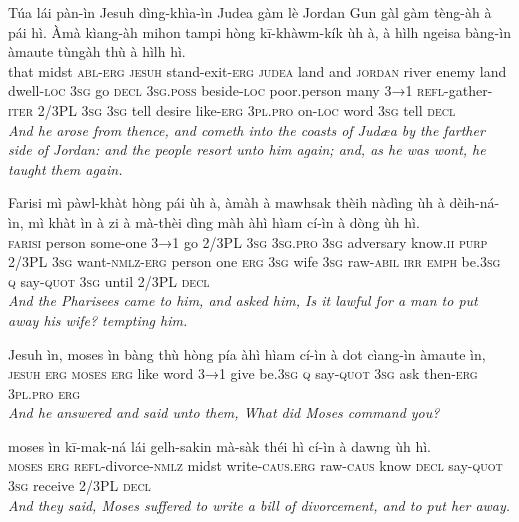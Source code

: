 \documentclass[11pt,a4paper]{article}
\begin{document}
\begin{exe}
\gll Túa lái pàn-ìn Jesuh dìng-khìa-ìn Judea gàm lè Jordan Gun gàl gàm tèng-àh à pái hì. Àmà kìang-àh mihon tampi hòng kī-khàwm-kík ùh à, à hìlh ngeisa bàng-ìn àmaute tùngàh thù à hìlh hì. \\
     that midst \textsc{abl}-\textsc{erg} \textsc{jesuh} stand-exit-\textsc{erg} \textsc{judea} land and \textsc{jordan} river enemy land dwell-\textsc{loc} \textsc{3sg} go \textsc{decl} \textsc{3sg}.\textsc{poss} beside-\textsc{loc} poor.person many \textsc{3→1} \textsc{refl}-gather-\textsc{iter} 2/3PL \textsc{3sg} \textsc{3sg} tell desire like-\textsc{erg} \textsc{3pl}.\textsc{pro} on-\textsc{loc} word \textsc{3sg} tell \textsc{decl} \\
\glt \textcolor{kjvcolor}{\textit{And he arose from thence, and cometh into the coasts of Judæa by the farther side of Jordan: and the people resort unto him again; and, as he was wont, he taught them again.}}

\gll Farisi mì pàwl-khàt hòng pái ùh à, àmàh à mawhsak thèih nàdìng ùh à dèih-ná-ìn, mì khàt ìn à zi à mà-thèi dìng màh àhì hìam cí-ìn à dòng ùh hì. \\
     \textsc{farisi} person some-one \textsc{3→1} go 2/3PL \textsc{3sg} \textsc{3sg}.\textsc{pro} \textsc{3sg} adversary know.\textsc{ii} \textsc{purp} 2/3PL \textsc{3sg} want-\textsc{nmlz}-\textsc{erg} person one \textsc{erg} \textsc{3sg} wife \textsc{3sg} raw-\textsc{abil} \textsc{irr} \textsc{emph} be.\textsc{3sg} \textsc{q} say-\textsc{quot} \textsc{3sg} until 2/3PL \textsc{decl} \\
\glt \textcolor{kjvcolor}{\textit{And the Pharisees came to him, and asked him, Is it lawful for a man to put away his wife? tempting him.}}

\gll Jesuh ìn, moses ìn bàng thù hòng pía àhì hìam cí-ìn à dot cìang-ìn àmaute ìn, \\
     \textsc{jesuh} \textsc{erg} \textsc{moses} \textsc{erg} like word \textsc{3→1} give be.\textsc{3sg} \textsc{q} say-\textsc{quot} \textsc{3sg} ask then-\textsc{erg} \textsc{3pl}.\textsc{pro} \textsc{erg} \\
\glt \textcolor{kjvcolor}{\textit{And he answered and said unto them, What did Moses command you?}}

\gll moses ìn kī-mak-ná lái gelh-sakin mà-sàk théi hì cí-ìn à dawng ùh hì. \\
     \textsc{moses} \textsc{erg} \textsc{refl}-divorce-\textsc{nmlz} midst write-\textsc{caus}.\textsc{erg} raw-\textsc{caus} know \textsc{decl} say-\textsc{quot} \textsc{3sg} receive 2/3PL \textsc{decl} \\
\glt \textcolor{kjvcolor}{\textit{And they said, Moses suffered to write a bill of divorcement, and to put her away.}}


\end{exe}
\end{document}
